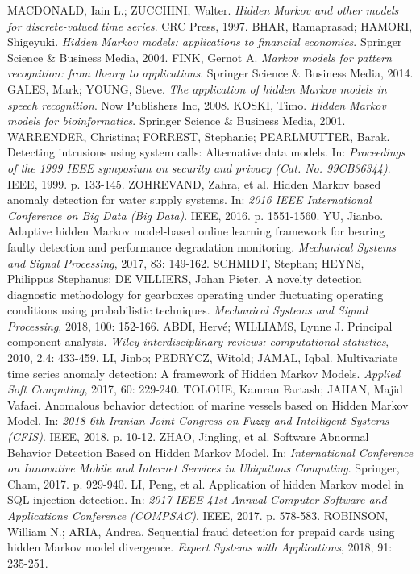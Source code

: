 \documentclass[11pt,twoside,openright]{report}
\begin{document}
\begin{thebibliography}{L}
MACDONALD, Iain L.; ZUCCHINI, Walter. \textit{Hidden Markov and other models for discrete-valued time series}. CRC Press, 1997.
BHAR, Ramaprasad; HAMORI, Shigeyuki. \textit{Hidden Markov models: applications to financial economics}. Springer Science \& Business Media, 2004.
FINK, Gernot A. \textit{Markov models for pattern recognition: from theory to applications}. Springer Science \& Business Media, 2014.
GALES, Mark; YOUNG, Steve. \textit{The application of hidden Markov models in speech recognition}. Now Publishers Inc, 2008.
KOSKI, Timo. \textit{Hidden Markov models for bioinformatics}. Springer Science \& Business Media, 2001.
WARRENDER, Christina; FORREST, Stephanie; PEARLMUTTER, Barak. Detecting intrusions using system calls: Alternative data models. In: \textit{Proceedings of the 1999 IEEE symposium on security and privacy (Cat. No. 99CB36344)}. IEEE, 1999. p. 133-145.
ZOHREVAND, Zahra, et al. Hidden Markov based anomaly detection for water supply systems. In: \textit{2016 IEEE International Conference on Big Data (Big Data)}. IEEE, 2016. p. 1551-1560.
YU, Jianbo. Adaptive hidden Markov model-based online learning framework for bearing faulty detection and performance degradation monitoring. \textit{Mechanical Systems and Signal Processing}, 2017, 83: 149-162.
SCHMIDT, Stephan; HEYNS, Philippus Stephanus; DE VILLIERS, Johan Pieter. A novelty detection diagnostic methodology for gearboxes operating under fluctuating operating conditions using probabilistic techniques. \textit{Mechanical Systems and Signal Processing}, 2018, 100: 152-166.
ABDI, Hervé; WILLIAMS, Lynne J. Principal component analysis. \textit{Wiley interdisciplinary reviews: computational statistics}, 2010, 2.4: 433-459.
LI, Jinbo; PEDRYCZ, Witold; JAMAL, Iqbal. Multivariate time series anomaly detection: A framework of Hidden Markov Models. \textit{Applied Soft Computing}, 2017, 60: 229-240.
TOLOUE, Kamran Fartash; JAHAN, Majid Vafaei. Anomalous behavior detection of marine vessels based on Hidden Markov Model. In: \textit{2018 6th Iranian Joint Congress on Fuzzy and Intelligent Systems (CFIS)}. IEEE, 2018. p. 10-12.
ZHAO, Jingling, et al. Software Abnormal Behavior Detection Based on Hidden Markov Model. In: \textit{International Conference on Innovative Mobile and Internet Services in Ubiquitous Computing}. Springer, Cham, 2017. p. 929-940.
LI, Peng, et al. Application of hidden Markov model in SQL injection detection. In: \textit{2017 IEEE 41st Annual Computer Software and Applications Conference (COMPSAC)}. IEEE, 2017. p. 578-583.
ROBINSON, William N.; ARIA, Andrea. Sequential fraud detection for prepaid cards using hidden Markov model divergence. \textit{Expert Systems with Applications}, 2018, 91: 235-251.


\end{thebibliography}
\end{document}
